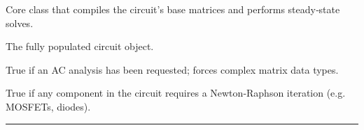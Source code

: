 \documentclass[letterpaper,10pt,english]{sphinxmanual}
\begin{document}
\begin{fulllineitems}
\label{\detokenize{dc_engine:DCEngine}}
\pysigstartsignatures
\pysiglinewithargsret
{}
{\sphinxparamcomma {}\sphinxparamcomma {}}
{}
\pysigstopsignatures
\sphinxAtStartPar
Core class that compiles the circuit’s base matrices and performs
steady‑state solves.

\begin{fulllineitems}
\label{\detokenize{dc_engine:DCEngine.circuit}}
\pysigstartsignatures
\pysigline
{}
\pysigstopsignatures
\sphinxAtStartPar
{} \textendash{} The fully populated circuit object.

\end{fulllineitems}


\begin{fulllineitems}
\label{\detokenize{dc_engine:DCEngine.is_complex}}
\pysigstartsignatures
\pysigline
{}
\pysigstopsignatures
\sphinxAtStartPar
{} \textendash{} True if an AC analysis has been requested; forces complex
matrix data types.

\end{fulllineitems}


\begin{fulllineitems}
\label{\detokenize{dc_engine:DCEngine.is_nonlinear}}
\pysigstartsignatures
\pysigline
{}
\pysigstopsignatures
\sphinxAtStartPar
{} \textendash{} True if any component in the circuit requires a Newton‑Raphson
iteration (e.g. MOSFETs, diodes).

\end{fulllineitems}


\end{fulllineitems}



\bigskip\hrule\bigskip
\end{document}
